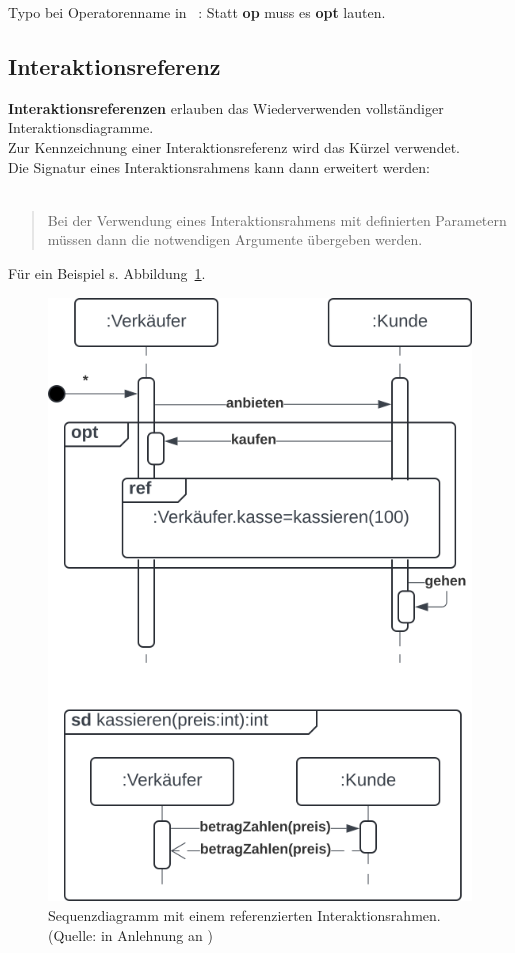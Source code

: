\begin{tcolorbox}[title=Syntax Antworten,colback=red!20]
    Typo bei Operatorenname in ~\cite[34]{Buh09}:
    Statt \textbf{op} muss es \textbf{opt} lauten.
\end{tcolorbox}

\subsection{Interaktionsreferenz}

\textbf{Interaktionsreferenzen} erlauben das Wiederverwenden vollständiger Interaktionsdiagramme.\\
Zur Kennzeichnung einer Interaktionsreferenz wird das Kürzel  verwendet.\\
Die Signatur eines Interaktionsrahmens kann dann erweitert werden:\\

\noindent
{}\\

\blockquote[{\cite[35]{Buh09}}]{
Bei der Verwendung eines Interaktionsrahmens mit definierten Parametern müssen dann die notwendigen Argumente übergeben werden.
}

Für ein Beispiel s. Abbildung~\ref{fig:interaktionsreferenz}.

\begin{figure}
    \centering
    \includegraphics[scale=0.5]{part three/Sequenzdiagramme/img/interaktionsreferenz}
    \caption{Sequenzdiagramm mit einem referenzierten Interaktionsrahmen. (Quelle: in Anlehnung an \cite[35]{Buh09})}
    \label{fig:interaktionsreferenz}
\end{figure}